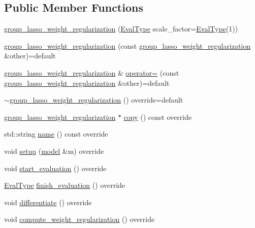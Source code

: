 \subsection*{Public Member Functions}
\begin{DoxyCompactItemize}
\item 
\hyperlink{classlbann_1_1group__lasso__weight__regularization_a6ffca49b19d4adbff300a229ef85ac3b}{group\+\_\+lasso\+\_\+weight\+\_\+regularization} (\hyperlink{base_8hpp_a3266f5ac18504bbadea983c109566867}{Eval\+Type} scale\+\_\+factor=\hyperlink{base_8hpp_a3266f5ac18504bbadea983c109566867}{Eval\+Type}(1))
\item 
\hyperlink{classlbann_1_1group__lasso__weight__regularization_a1b179a63937fe8e3de320707e84920bf}{group\+\_\+lasso\+\_\+weight\+\_\+regularization} (const \hyperlink{classlbann_1_1group__lasso__weight__regularization}{group\+\_\+lasso\+\_\+weight\+\_\+regularization} \&other)=default
\item 
\hyperlink{classlbann_1_1group__lasso__weight__regularization}{group\+\_\+lasso\+\_\+weight\+\_\+regularization} \& \hyperlink{classlbann_1_1group__lasso__weight__regularization_aaf1af923c624618ab823c7ac73bc4333}{operator=} (const \hyperlink{classlbann_1_1group__lasso__weight__regularization}{group\+\_\+lasso\+\_\+weight\+\_\+regularization} \&other)=default
\item 
\hyperlink{classlbann_1_1group__lasso__weight__regularization_a8a7a5cc007c3fae62a95d500cee239ce}{$\sim$group\+\_\+lasso\+\_\+weight\+\_\+regularization} () override=default
\item 
\hyperlink{classlbann_1_1group__lasso__weight__regularization}{group\+\_\+lasso\+\_\+weight\+\_\+regularization} $\ast$ \hyperlink{classlbann_1_1group__lasso__weight__regularization_a279b67ef561918425e78cb9b2fa9bb88}{copy} () const override
\item 
std\+::string \hyperlink{classlbann_1_1group__lasso__weight__regularization_a1cd895144b2816592ceeecd4d2f7a1d1}{name} () const override
\item 
void \hyperlink{classlbann_1_1group__lasso__weight__regularization_af413161b1feefa3bb472079635547c57}{setup} (\hyperlink{classlbann_1_1model}{model} \&m) override
\item 
void \hyperlink{classlbann_1_1group__lasso__weight__regularization_a5cc5fd80eed7f2b9d881c48edc6d49d0}{start\+\_\+evaluation} () override
\item 
\hyperlink{base_8hpp_a3266f5ac18504bbadea983c109566867}{Eval\+Type} \hyperlink{classlbann_1_1group__lasso__weight__regularization_a48c46b2e06337e1890b12811182db11b}{finish\+\_\+evaluation} () override
\item 
void \hyperlink{classlbann_1_1group__lasso__weight__regularization_a9d5843ebd2c3a1f77013c7b2bebb7a69}{differentiate} () override
\item 
void \hyperlink{classlbann_1_1group__lasso__weight__regularization_a9d721928716349c8327ca67257fb827a}{compute\+\_\+weight\+\_\+regularization} () override
\end{DoxyCompactItemize}
